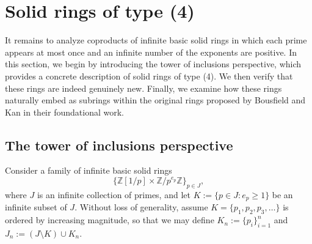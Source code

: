 \documentclass{amsart}
\newcommand{\Z}{{\mathbb Z}}
\begin{document}


    \section{Solid rings of type (4)}

    It remains to analyze coproducts of infinite basic solid rings in which each prime appears at most once and an infinite number of the exponents are positive.
    In this section, we begin by introducing the tower of inclusions perspective, which provides a concrete description of solid rings of type (4).
    We then verify that these rings are indeed genuinely new.
    Finally, we examine how these rings naturally embed as subrings within the original rings proposed by Bousfield and Kan in their foundational work.
    \subsection{The tower of inclusions perspective}

    Consider a family of infinite basic solid rings
    $$
    \{\Z[1/p] \times \Z/p^{e_p}\Z\}_{p \in J},
    $$
    where $J$ is an infinite collection of primes, and let $K := \{p \in J : e_p \geq 1\}$ be an infinite subset of $J$.  
    Without loss of generality, assume $K = \{p_1, p_2, p_3, \dots\}$ is ordered by increasing magnitude, so that we may define $K_n := \{p_i\}_{i = 1}^n$ and $J_n := (J \setminus K) \cup K_n$.
    
\end{document}
